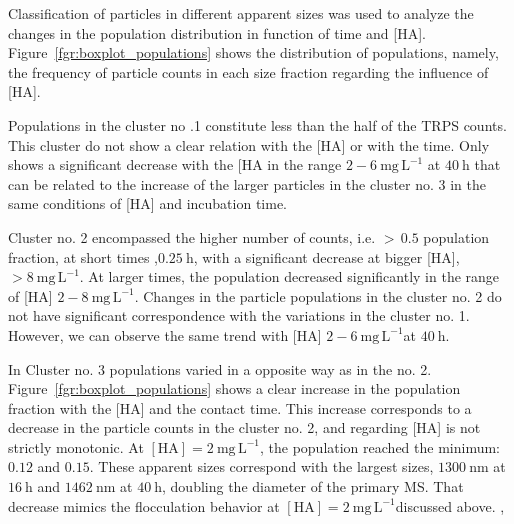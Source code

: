 \documentclass[journal=langd5,manuscript=article]{achemso}
\begin{document}
Classification of particles in different apparent sizes was used to analyze the changes in the population distribution in function of time and [HA]. Figure~\ref{fgr:boxplot_populations} shows the distribution of populations, namely, the frequency of particle counts in each size fraction regarding the influence of [HA].

Populations in the cluster no .1 constitute less than the half of the TRPS counts. This cluster do not show a clear relation with the [HA] or with the time. Only  shows a  significant decrease with the [HA in the range $2-6~\mathrm{mg\,L^{-1}}$ at $40~\mathrm{h}$ that can be related to the increase of the larger particles in the cluster no. 3 in the same conditions of [HA] and incubation time.

Cluster no. 2 encompassed the higher number of counts, i.e. $>\,0.5$ population fraction, at short times ,$0.25~\mathrm{h}$, with a significant decrease at bigger [HA], $>8~\mathrm{mg\,L^{-1}}$. At larger times, the population decreased significantly in the range of [HA] $2-8~\mathrm{mg\,L^{-1}}$. Changes in the particle populations in the cluster no. 2 do not have significant correspondence  with the variations in the cluster no. 1. However, we can observe the same trend with [HA] $2-6~\mathrm{mg\,L^{-1}}$at $40~\mathrm{h}$.

In Cluster no. 3 populations varied in a opposite way as in the no. 2. Figure~\ref{fgr:boxplot_populations} shows a clear increase in the population fraction with the [HA] and the contact time. This increase corresponds to a decrease in the particle counts in the cluster no. 2, and regarding [HA] is not strictly monotonic. At $\mathrm{[HA]} = 2~\mathrm{mg\,L^{-1}}$, the  population reached the  minimum: $0.12$  and $0.15$. These apparent sizes correspond with the largest sizes, $1300~\mathrm{nm}$ at $16~\mathrm{h}$ and $1462~\mathrm{nm}$ at $40~\mathrm{h}$, doubling the diameter of the primary MS. That decrease mimics the flocculation behavior at $\mathrm{[HA]} = 2~\mathrm{mg\,L^{-1}}$discussed above. ,
\end{document}
